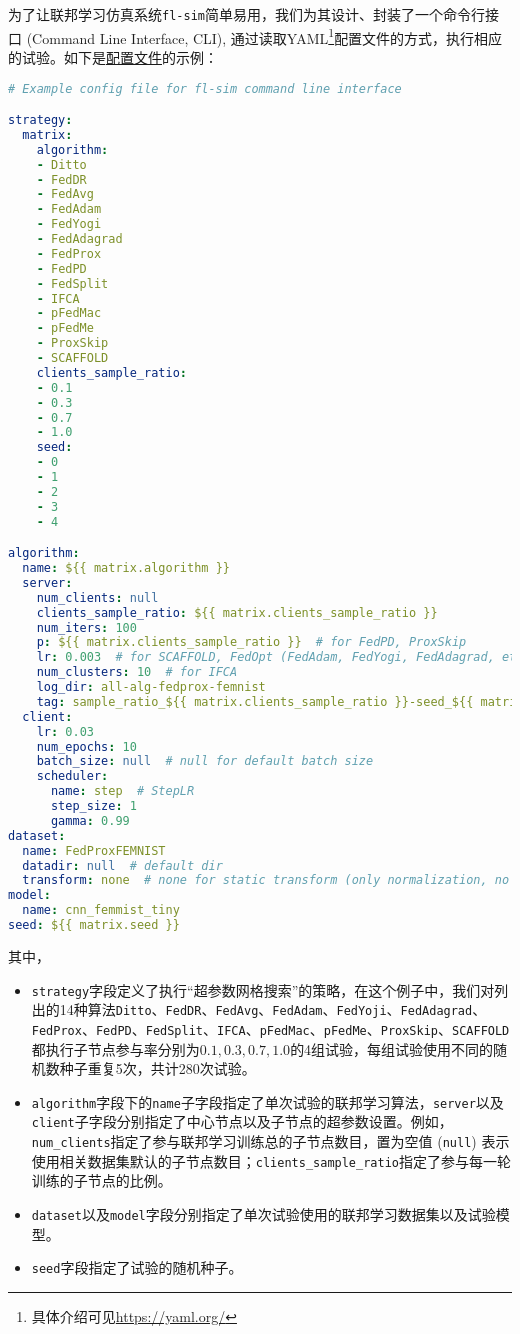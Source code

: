 为了让联邦学习仿真系统\texttt{fl-sim}简单易用，我们为其设计、封装了一个命令行接口 (Command Line Interface, CLI), 通过读取YAML\footnote{具体介绍可见\url{https://yaml.org/}}配置文件的方式，执行相应的试验。如下是\href{https://github.com/wenh06/fl-sim/blob/master/example-configs/all-alg-fedprox-femnist.yml}{配置文件}的示例：
\begin{lstlisting}[language=yaml, caption={一份典型的联邦学习仿真系统\texttt{fl-sim}命令行接口配置文件},label={lst:fl-sim-config}]
# Example config file for fl-sim command line interface

strategy:
  matrix:
    algorithm:
    - Ditto
    - FedDR
    - FedAvg
    - FedAdam
    - FedYogi
    - FedAdagrad
    - FedProx
    - FedPD
    - FedSplit
    - IFCA
    - pFedMac
    - pFedMe
    - ProxSkip
    - SCAFFOLD
    clients_sample_ratio:
    - 0.1
    - 0.3
    - 0.7
    - 1.0
    seed:
    - 0
    - 1
    - 2
    - 3
    - 4

algorithm:
  name: ${{ matrix.algorithm }}
  server:
    num_clients: null
    clients_sample_ratio: ${{ matrix.clients_sample_ratio }}
    num_iters: 100
    p: ${{ matrix.clients_sample_ratio }}  # for FedPD, ProxSkip
    lr: 0.003  # for SCAFFOLD, FedOpt (FedAdam, FedYogi, FedAdagrad, etc.), this parameter is quite sensitive
    num_clusters: 10  # for IFCA
    log_dir: all-alg-fedprox-femnist
    tag: sample_ratio_${{ matrix.clients_sample_ratio }}-seed_${{ matrix.seed }}
  client:
    lr: 0.03
    num_epochs: 10
    batch_size: null  # null for default batch size
    scheduler:
      name: step  # StepLR
      step_size: 1
      gamma: 0.99
dataset:
  name: FedProxFEMNIST
  datadir: null  # default dir
  transform: none  # none for static transform (only normalization, no augmentation)
model:
  name: cnn_femmist_tiny
seed: ${{ matrix.seed }}
\end{lstlisting}
其中，
\begin{itemize}
    \item \texttt{strategy}字段定义了执行``超参数网格搜索''的策略，在这个例子中，我们对列出的14种算法\texttt{Ditto}、\texttt{FedDR}、\texttt{FedAvg}、\texttt{FedAdam}、\texttt{FedYoji}、\texttt{FedAdagrad}、\texttt{FedProx}、\texttt{FedPD}、\texttt{FedSplit}、\texttt{IFCA}、\texttt{pFedMac}、\texttt{pFedMe}、\texttt{ProxSkip}、\texttt{SCAFFOLD}都执行子节点参与率分别为$0.1, 0.3, 0.7, 1.0$的4组试验，每组试验使用不同的随机数种子重复5次，共计280次试验。
    \item \texttt{algorithm}字段下的\texttt{name}子字段指定了单次试验的联邦学习算法，\texttt{server}以及\texttt{client}子字段分别指定了中心节点以及子节点的超参数设置。例如，\texttt{num\_clients}指定了参与联邦学习训练总的子节点数目，置为空值 (\texttt{null}) 表示使用相关数据集默认的子节点数目；\texttt{clients\_sample\_ratio}指定了参与每一轮训练的子节点的比例。
    \item \texttt{dataset}以及\texttt{model}字段分别指定了单次试验使用的联邦学习数据集以及试验模型。
    \item \texttt{seed}字段指定了试验的随机种子。
\end{itemize}


